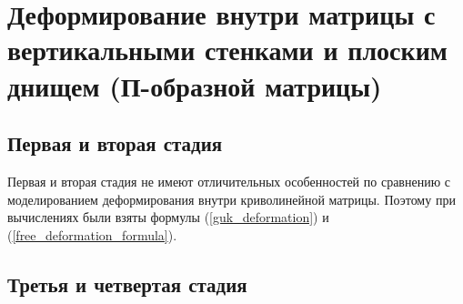 \section{Деформирование внутри матрицы с вертикальными стенками и плоским днищем (П-образной матрицы)}
	\subsection{Первая и вторая стадия}
		Первая и вторая стадия не имеют отличительных особенностей по сравнению 
		с моделированием деформирования внутри криволинейной матрицы. Поэтому 
		при вычислениях были взяты формулы (\ref{guk_deformation}) и (\ref{free_deformation_formula}).
	\subsection{Третья и четвертая стадия}
	
